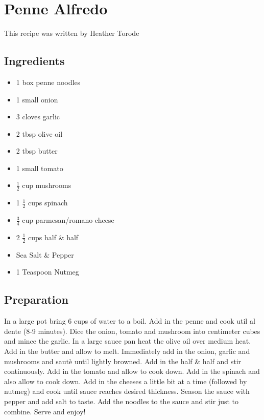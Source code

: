 \thispagestyle{fancy}
\section{Penne Alfredo}
\AddToShipoutPicture*{\Alfredo}

This recipe was written by Heather Torode

\subsection*{Ingredients}
\begin{multicols}{3}
	\begin{itemize}
		\item 1 box penne noodles		
		\item 1 small onion		
		\item 3 cloves garlic		
		\item 2 tbsp olive oil		
		\item 2 tbsp butter		
		\item 1 small tomato		
		\item $\frac{1}{2}$ cup mushrooms		
		\item 1 $\frac{1}{2}$  cups spinach		
		\item $\frac{3}{4}$ cup parmesan/romano cheese		
		\item 2 $\frac{1}{2}$ cups half \& half
		\item Sea Salt \& Pepper
		\item 1 Teaspoon Nutmeg
	\end{itemize}
\end{multicols}

\subsection*{Preparation}

In a large pot bring 6 cups of water to a boil. Add in the penne and cook util al dente (8-9 minutes). Dice the onion, tomato and mushroom into centimeter cubes and mince the garlic. In a large sauce pan heat the olive oil over medium heat. Add in the butter and allow to melt. Immediately add in the onion, garlic and mushrooms and saut\`{e} until lightly browned. Add in the half \& half and stir continuously. Add in the tomato and allow to cook down. Add in the spinach and also allow to cook down. Add in the cheeses a little bit at a time (followed by nutmeg) and cook until sauce reaches desired thickness. Season the sauce with pepper and add salt to taste. Add the noodles to the sauce and stir just to combine. Serve and enjoy!
